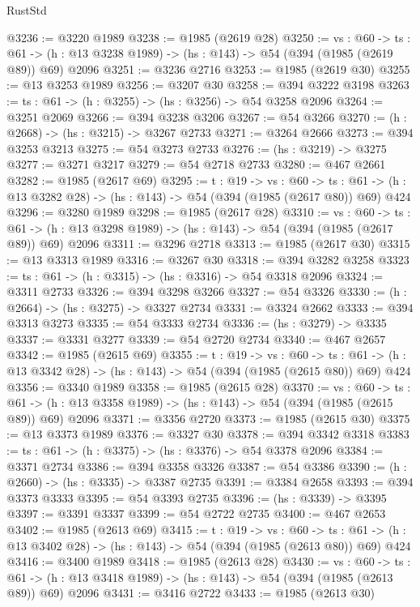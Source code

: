 \begin{lexlean}{RustStd}
\begin{coremodule}
{\begin{coremodule}
{{{{{{{{{{@3236 := @3220 @1989
@3238 := @1985 (@2619 @28)
@3250 := {vs : @60} ->
  {ts : @61} -> (h : @13 @3238 @1989) -> (hs : @143) -> @54 (@394 (@1985 (@2619 @89)) @69) @2096
@3251 := @3236 @2716
@3253 := @1985 (@2619 @30)
@3255 := @13 @3253 @1989
@3256 := @3207 @30
@3258 := @394 @3222 @3198
@3263 := {ts : @61} -> (h : @3255) -> (hs : @3256) -> @54 @3258 @2096
@3264 := @3251 @2069
@3266 := @394 @3238 @3206
@3267 := @54 @3266
@3270 := (h : @2668) -> (hs : @3215) -> @3267 @2733
@3271 := @3264 @2666
@3273 := @394 @3253 @3213
@3275 := @54 @3273 @2733
@3276 := (hs : @3219) -> @3275
@3277 := @3271 @3217
@3279 := @54 @2718 @2733
@3280 := @467 @2661
@3282 := @1985 (@2617 @69)
@3295 := {t : @19} ->
  {vs : @60} ->
  {ts : @61} -> (h : @13 @3282 @28) -> (hs : @143) -> @54 (@394 (@1985 (@2617 @80)) @69) @424
@3296 := @3280 @1989
@3298 := @1985 (@2617 @28)
@3310 := {vs : @60} ->
  {ts : @61} -> (h : @13 @3298 @1989) -> (hs : @143) -> @54 (@394 (@1985 (@2617 @89)) @69) @2096
@3311 := @3296 @2718
@3313 := @1985 (@2617 @30)
@3315 := @13 @3313 @1989
@3316 := @3267 @30
@3318 := @394 @3282 @3258
@3323 := {ts : @61} -> (h : @3315) -> (hs : @3316) -> @54 @3318 @2096
@3324 := @3311 @2733
@3326 := @394 @3298 @3266
@3327 := @54 @3326
@3330 := (h : @2664) -> (hs : @3275) -> @3327 @2734
@3331 := @3324 @2662
@3333 := @394 @3313 @3273
@3335 := @54 @3333 @2734
@3336 := (hs : @3279) -> @3335
@3337 := @3331 @3277
@3339 := @54 @2720 @2734
@3340 := @467 @2657
@3342 := @1985 (@2615 @69)
@3355 := {t : @19} ->
  {vs : @60} ->
  {ts : @61} -> (h : @13 @3342 @28) -> (hs : @143) -> @54 (@394 (@1985 (@2615 @80)) @69) @424
@3356 := @3340 @1989
@3358 := @1985 (@2615 @28)
@3370 := {vs : @60} ->
  {ts : @61} -> (h : @13 @3358 @1989) -> (hs : @143) -> @54 (@394 (@1985 (@2615 @89)) @69) @2096
@3371 := @3356 @2720
@3373 := @1985 (@2615 @30)
@3375 := @13 @3373 @1989
@3376 := @3327 @30
@3378 := @394 @3342 @3318
@3383 := {ts : @61} -> (h : @3375) -> (hs : @3376) -> @54 @3378 @2096
@3384 := @3371 @2734
@3386 := @394 @3358 @3326
@3387 := @54 @3386
@3390 := (h : @2660) -> (hs : @3335) -> @3387 @2735
@3391 := @3384 @2658
@3393 := @394 @3373 @3333
@3395 := @54 @3393 @2735
@3396 := (hs : @3339) -> @3395
@3397 := @3391 @3337
@3399 := @54 @2722 @2735
@3400 := @467 @2653
@3402 := @1985 (@2613 @69)
@3415 := {t : @19} ->
  {vs : @60} ->
  {ts : @61} -> (h : @13 @3402 @28) -> (hs : @143) -> @54 (@394 (@1985 (@2613 @80)) @69) @424
@3416 := @3400 @1989
@3418 := @1985 (@2613 @28)
@3430 := {vs : @60} ->
  {ts : @61} -> (h : @13 @3418 @1989) -> (hs : @143) -> @54 (@394 (@1985 (@2613 @89)) @69) @2096
@3431 := @3416 @2722
@3433 := @1985 (@2613 @30)
}}}}}}}}}}
\end{coremodule}}
\end{coremodule}
\end{lexlean}
